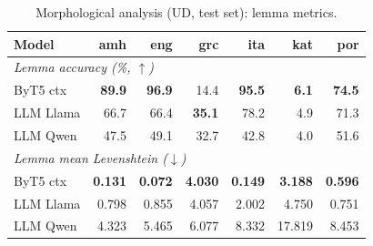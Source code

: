 \begin{table}[h]
\centering
\small
\setlength{\tabcolsep}{5pt}
\renewcommand{\arraystretch}{1.10}
\begin{tabular}{lrrrrrr}
\toprule
Model & amh & eng & grc & ita & kat & por \\
\midrule
\multicolumn{7}{l}{\textit{Lemma accuracy (\%, $\uparrow$)}} \\
ByT5 ctx & \textbf{89.9} & \textbf{96.9} & 14.4 & \textbf{95.5} & \textbf{6.1} & \textbf{74.5} \\
LLM Llama & 66.7 & 66.4 & \textbf{35.1} & 78.2 & 4.9 & 71.3 \\
LLM Qwen & 47.5 & 49.1 & 32.7 & 42.8 & 4.0 & 51.6 \\
\midrule
\multicolumn{7}{l}{\textit{Lemma mean Levenshtein ($\downarrow$)}} \\
ByT5 ctx & \textbf{0.131} & \textbf{0.072} & \textbf{4.030} & \textbf{0.149} & \textbf{3.188} & \textbf{0.596} \\
LLM Llama & 0.798 & 0.855 & 4.057 & 2.002 & 4.750 & 0.751 \\
LLM Qwen & 4.323 & 5.465 & 6.077 & 8.332 & 17.819 & 8.453 \\
\bottomrule
\end{tabular}
\caption{Morphological analysis (UD, test set): lemma metrics.}
\label{tab:results-analysis-ud-lemma-matrix}
\end{table}
